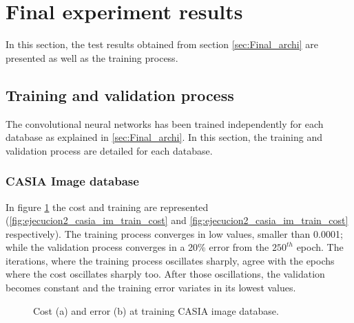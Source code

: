 \section{Final experiment results}
In this section, the test results obtained from section \ref{sec:Final_archi} are presented as well as the training process.

\subsection{Training and validation process}
The convolutional neural networks has been trained independently for each database as  explained in \ref{sec:Final_archi}. In this section, the training and validation process are detailed for each database.

\subsubsection{CASIA Image database}
In figure \ref{fig:ejecucion2_casia_im_train} the cost and training are represented (\ref{fig:ejecucion2_casia_im_train_cost} and \ref{fig:ejecucion2_casia_im_train_cost} respectively). The training process converges in  low values, smaller than 0.0001; while the validation process converges in a 20\% error from the $250^{th}$ epoch. The iterations, where the training process oscillates sharply, agree with the epochs where the cost oscillates sharply too. After those oscillations, the validation becomes constant and the training error variates in its lowest values.\\
\begin{figure}[htb]
\centering
\caption{Cost (a) and error (b) at training CASIA image database.}
\label{fig:ejecucion2_casia_im_train}
\end{figure}

